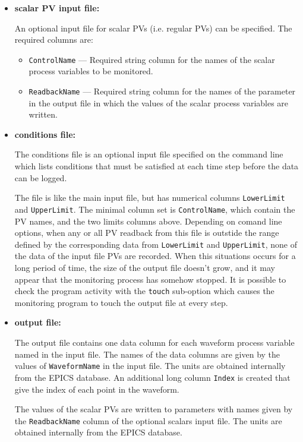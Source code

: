 \begin{itemize}
\begin{itemize}
\item {\bf scalar PV input file:}\par
An optional input file for scalar PVs (i.e. regular PVs) can be specified. The required columns are:
\begin{itemize}
        \item {\tt ControlName} --- Required string column for the names of the scalar process variables
                to be monitored.
        \item {\tt ReadbackName} --- Required string column for the names of the parameter in the 
                output file in which the values of the scalar process variables are written.
\end{itemize}

\item {\bf conditions file:} \par
The conditions file is an optional input file specified on the command line which lists
conditions that must be satisfied at each time step before the data can be logged.

The file is like the main input file, but has numerical columns \verb+LowerLimit+ and \verb+UpperLimit+.
The minimal column set is \verb+ControlName+, which contain the PV names, and the two limits columns above.
Depending on comand line options, when any or all PV readback from this file
is outstide the range defined by the corresponding data from \verb+LowerLimit+ and \verb+UpperLimit+,
none of the data of the input file PVs are recorded. 
When this situations occurs for a long period of time, the size of the output file doesn't
grow, and it may appear that the monitoring process has somehow stopped.
It is possible to check the program activity with the \verb+touch+ sub-option
which causes the monitoring program to touch the output file at every step.

\item {\bf output file:}\par
The output file contains one data column for each waveform process variable named in the input file. The names
of the data columns are given by the values of {\verb+WaveformName+} in the input file. The units are obtained
internally from the EPICS database. An additional long column \verb+Index+ is created that give the index
of each point in the waveform.

The values of the scalar PVs are written to parameters with names given by the {\tt ReadbackName} column
of the optional scalars input file. The units are obtained internally from the EPICS database.


\end{itemize}
\end{itemize}

